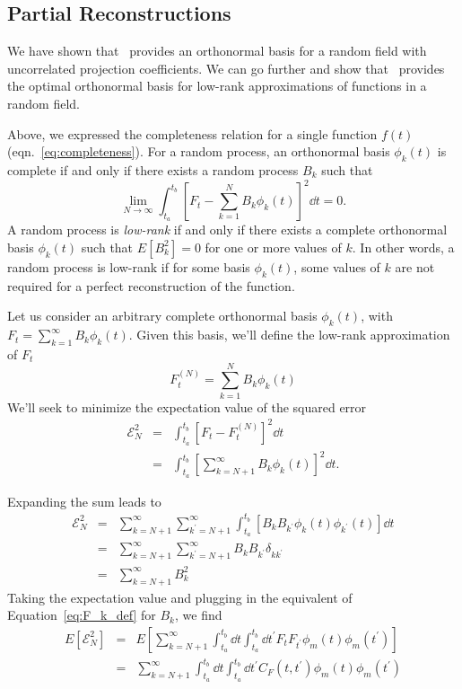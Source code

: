 \subsection{Partial Reconstructions}
\label{sec:partial_recons}
We have shown that \KL\ provides an orthonormal basis for a random field
with uncorrelated projection coefficients.  We can go further and show
that \KL\ provides the
optimal orthonormal basis for low-rank approximations of functions in
a random field.

Above, we expressed the completeness relation for a single function $f(t)$
(eqn.~\ref{eq:completeness}).
For a random process, an orthonormal basis
$\phi_k(t)$ is complete if and only if there
exists a random process $B_k$ such that
\begin{equation}
  \label{eq:completeness_rp}
  \lim_{N\to\infty} \int_{t_a}^{t_b}
  \left[F_t - \sum_{k=1}^{N}B_k \phi_k(t)\right]^2 \dd t = 0.
\end{equation}
A random process is {\it low-rank} if and only if there exists a complete
orthonormal
basis $\phi_k(t)$ such that $E[B_k^2] = 0$ for one or more values of $k$.
In other words, a random process is low-rank if for some basis $\phi_k(t)$,
some values of $k$ are not required for a perfect reconstruction of the
function.

Let us consider an arbitrary complete orthonormal basis
$\phi_k(t)$, with $F_t = \sum_{k=1}^\infty B_k\phi_k(t)$.
Given this basis, we'll define the low-rank approximation of $F_t$
\begin{equation}
  F^{(N)}_t = \sum_{k=1}^N B_k\phi_k(t)
\end{equation}
We'll seek to minimize the expectation value of the squared error
\begin{eqnarray}
  \mathcal{E}^2_N &=& \int_{t_a}^{t_b} \left[F_t - F_t^{(N)}\right]^2 \dd t
  \nonumber\\
  &=& \int_{t_a}^{t_b} \left[\sum_{k = N + 1}^\infty B_k \phi_k(t)\right]^2 \dd t.
\end{eqnarray}


Expanding the sum leads to
\begin{eqnarray}
  \mathcal{E}^2_N &=& \sum_{k=N + 1}^\infty
  \sum_{k^\prime=N + 1}^\infty \int_{t_a}^{t_b} 
  \left[B_k B_{k^\prime} \phi_k(t) \phi_{k^\prime}(t)\right] \dd t
  \nonumber\\
  &=& \sum_{k=N+1}^\infty \sum_{k^\prime=N+1}^\infty B_k B_{k^\prime}
  \delta_{kk^\prime}\nonumber\\
  &=& \sum_{k=N+1}^\infty B_k^2
\end{eqnarray}
Taking the expectation value and plugging in the equivalent of
Equation~\ref{eq:F_k_def} for $B_k$, we find
\begin{eqnarray}
  E[\mathcal{E}^2_N] &=&
  E\left[\sum_{k=N+1}^\infty \int_{t_a}^{t_b} \dd t \int_{t_a}^{t_b} \dd t^\prime
  F_tF_{t^\prime} \phi_m(t)\phi_m(t^\prime)\right] \nonumber\\
  &=& \sum_{k=N+1}^\infty \int_{t_a}^{t_b} \dd t \int_{t_a}^{t_b} \dd t^\prime
  C_F(t, t^\prime) \phi_m(t)\phi_m(t^\prime)
\end{eqnarray}

